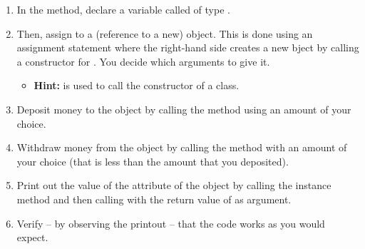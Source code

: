 \begin{enumerate}
\begin{itemize}
    \end{itemize}
  \item In the  method, declare a variable called  of type .
  \item Then, assign to  a (reference to a new)  object. This is done using an assignment statement where the right-hand side creates a new  bject by calling a constructor for . You decide which arguments to give it.
    \begin{itemize}
      \item \textbf{Hint:}  is used to call the constructor of a class.
    \end{itemize}
  \item Deposit money to the  object by calling the  method using an amount of your choice.
  \item Withdraw money from the  object by calling the  method with an amount of your choice (that is less than the amount that you deposited).
  \item Print out the value of the  attribute of the  object by calling the  instance method and then calling  with the return value of  as argument.
  \item Verify -- by observing the printout -- that the code works as you would expect.
\end{enumerate}

